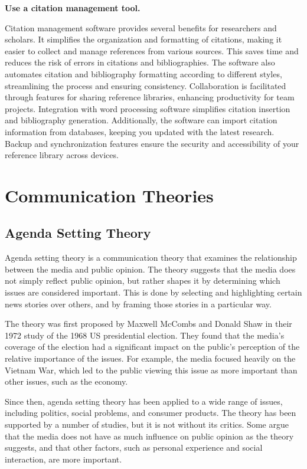 \documentclass[
  b5paper]{book}
\begin{document}
\textbf{Use a citation management tool.}

Citation management software provides several benefits for researchers and scholars. It simplifies the organization and formatting of citations, making it easier to collect and manage references from various sources. This saves time and reduces the risk of errors in citations and bibliographies. The software also automates citation and bibliography formatting according to different styles, streamlining the process and ensuring consistency. Collaboration is facilitated through features for sharing reference libraries, enhancing productivity for team projects. Integration with word processing software simplifies citation insertion and bibliography generation. Additionally, the software can import citation information from databases, keeping you updated with the latest research. Backup and synchronization features ensure the security and accessibility of your reference library across devices.

\hypertarget{communication-theories-1}{%
\chapter{Communication Theories}\label{communication-theories-1}}

\hypertarget{agenda-setting-theory}{%
\section{Agenda Setting Theory}\label{agenda-setting-theory}}

Agenda setting theory is a communication theory that examines the relationship between the media and public opinion. The theory suggests that the media does not simply reflect public opinion, but rather shapes it by determining which issues are considered important. This is done by selecting and highlighting certain news stories over others, and by framing those stories in a particular way.

The theory was first proposed by Maxwell McCombs and Donald Shaw in their 1972 study of the 1968 US presidential election. They found that the media's coverage of the election had a significant impact on the public's perception of the relative importance of the issues. For example, the media focused heavily on the Vietnam War, which led to the public viewing this issue as more important than other issues, such as the economy.

Since then, agenda setting theory has been applied to a wide range of issues, including politics, social problems, and consumer products. The theory has been supported by a number of studies, but it is not without its critics. Some argue that the media does not have as much influence on public opinion as the theory suggests, and that other factors, such as personal experience and social interaction, are more important.
\end{document}
